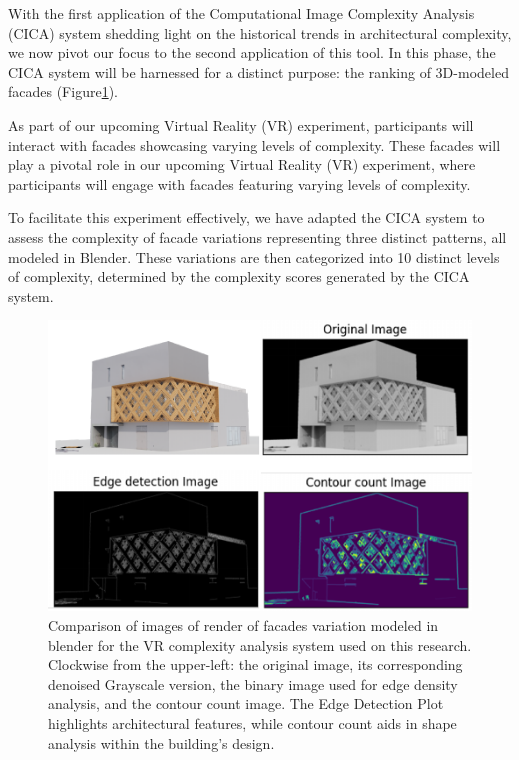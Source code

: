 
With the first application of the Computational Image Complexity Analysis (CICA) system shedding light on the historical trends in architectural complexity, we now pivot our focus to the second application of this tool.
In this phase, the CICA system will be harnessed for a distinct purpose: the ranking of 3D-modeled facades (Figure\ref{fig:ComplexityPlotRenderCICA}).

As part of our upcoming Virtual Reality (VR) experiment, participants will interact with facades showcasing varying levels of complexity.
These facades will play a pivotal role in our upcoming Virtual Reality (VR) experiment, where participants will engage with facades featuring varying levels of complexity.

To facilitate this experiment effectively, we have adapted the CICA system to assess the complexity of facade variations representing three distinct patterns, all modeled in Blender.
These variations are then categorized into 10 distinct levels of complexity, determined by the complexity scores generated by the CICA system.

     \begin{figure}[htb]
          \centering
          \includegraphics[width= \linewidth]{Images/ComplexitPlotRenderCICA}
          \caption{Comparison of images of render of facades variation modeled in blender for the VR complexity analysis system used on this research. Clockwise from the upper-left: the original image, its corresponding denoised Grayscale version, the binary image used for edge density analysis, and the contour count image. The Edge Detection Plot highlights architectural features, while contour count aids in shape analysis within the building's design.
          }
          \label{fig:ComplexityPlotRenderCICA}
        \end{figure}

